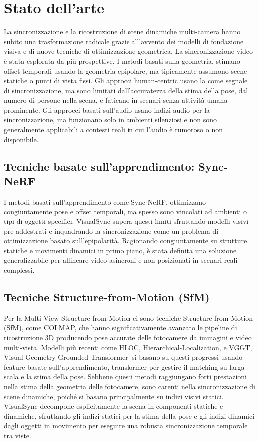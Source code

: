 \graphicspath{{chapters/chapter2/img}}
\chapter{Stato dell'arte} \label{storia dell'arte}
La sincronizzazione e la ricostruzione di scene dinamiche multi-camera hanno subito una trasformazione radicale grazie all'avvento dei modelli di fondazione visiva e di nuove tecniche di ottimizzazione geometrica. La sincronizzazione video è stata esplorata da più prospettive. I metodi basati sulla geometria, stimano offset temporali usando la geometria epipolare, ma tipicamente assumono scene statiche o punti di vista fissi. Gli approcci human-centric usano la  come segnale di sincronizzazione, ma sono limitati dall'accuratezza della stima della pose, dal numero di persone nella scena, e faticano in scenari senza attività umana prominente. Gli approcci basati sull'audio usano indizi audio per la sincronizzazione, ma funzionano solo in ambienti silenziosi e non sono generalmente applicabili a contesti reali in cui l'audio è rumoroso o non disponibile. 

\section{Tecniche basate sull'apprendimento: Sync-NeRF}
I metodi basati sull'apprendimento come Sync-NeRF, ottimizzano congiuntamente pose e offset temporali, ma spesso sono vincolati ad ambienti o tipi di oggetti specifici. 
VisualSync supera questi limiti sfruttando modelli visivi pre-addestrati e inquadrando la sincronizzazione come un problema di ottimizzazione basato sull'epipolarità. Ragionando congiuntamente su strutture statiche e movimenti dinamici in primo piano, è stata definita una soluzione generalizzabile per allineare video asincroni e non posizionati in scenari reali complessi.

\section{Tecniche Structure-from-Motion (SfM)}
Per la Multi-View Structure-from-Motion ci sono tecniche Structure-from-Motion (SfM), come COLMAP, che hanno significativamente avanzato le pipeline di ricostruzione 3D producendo pose accurate delle fotocamere da immagini e video multi-vista. Modelli più recenti come HLOC, Hierarchical-Localization, e VGGT, Visual Geometry Grounded Transformer, si basano su questi progressi usando feature basate sull'apprendimento, transformer per gestire il matching su larga scala e la stima della pose. Sebbene questi metodi raggiungano forti prestazioni nella stima della geometria delle fotocamere, sono carenti nella sincronizzazione di scene dinamiche, poiché si basano principalmente su indizi visivi statici. 
VisualSync decompone esplicitamente la scena in componenti statiche e dinamiche, sfruttando gli indizi statici per la
stima della pose e gli indizi dinamici dagli oggetti in movimento per eseguire una robusta
sincronizzazione temporale tra viste.


